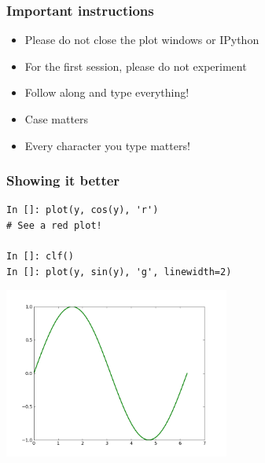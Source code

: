 \documentclass[14pt,compress]{beamer}
\newcommand{\emphbar}[1]
{\begin{beamercolorbox}[rounded=true]{emphbar}
      {#1}
 \end{beamercolorbox}
}
\begin{document}
\begin{frame}
  \frametitle{Important instructions}
  \begin{itemize}
  \item Please do not close the plot windows or IPython
  \item For the first session, please do not experiment
  \item Follow along and type everything!
  \item Case matters
  \item Every character you type matters!
  \end{itemize}
\end{frame}


\begin{frame}[fragile]
\frametitle{Showing it better}
\vspace{-0.15in}
\begin{lstlisting}
In []: plot(y, cos(y), 'r')
# See a red plot!

In []: clf()
In []: plot(y, sin(y), 'g', linewidth=2)
\end{lstlisting}
\vspace*{-0.2in}
\begin{center}
  \includegraphics[height=2.2in, interpolate=true]{data/green}
\end{center}
\end{frame}
\end{document}

